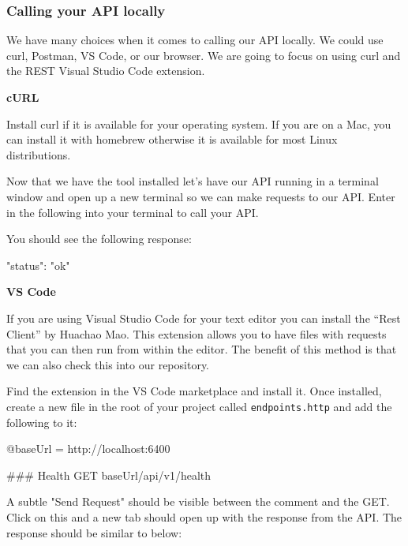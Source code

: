 \documentclass{csse4400}
\begin{document}
\subsubsection{Calling your API locally}

We have many choices when it comes to calling our API locally.
We could use curl, Postman, VS Code, or our browser.
We are going to focus on using curl and the REST Visual Studio Code extension.


\vspace{0.5em}
\textbf{cURL}

Install curl if it is available for your operating system. If you are on a Mac, you can install it with homebrew otherwise it is available for most Linux distributions.

Now that we have the tool installed let's have our API running in a terminal window and open up a new terminal so we can make requests to our API. Enter in the following into your terminal to call your API.


You should see the following response:

\begin{code}[language=json,numbers=none]{}
  {
    "status": "ok"
  }
\end{code}

\textbf{VS Code}

If you are using Visual Studio Code for your text editor you can install the ``Rest Client'' by Huachao Mao. This extension allows you to have files with requests that you can then run from  within the editor. The benefit of this method is that we can also check this into our repository.

Find the extension in the VS Code marketplace and install it. Once installed, create a new file in the root of your project called \texttt{endpoints.http} and add the following to it:

\begin{code}[numbers=none]{}
  @baseUrl = http://localhost:6400

  ### Health
  GET {{baseUrl}}/api/v1/health
\end{code}

A subtle "Send Request" should be visible between the comment and the GET. Click on this and a new tab should open up with the response from the API. The response should be similar to below:
\end{document}
